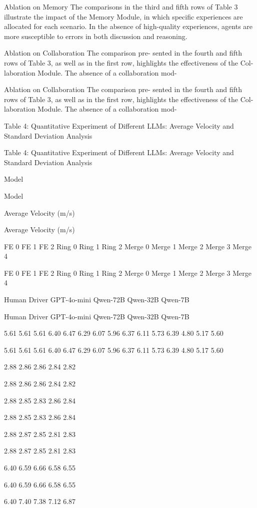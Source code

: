 \documentclass[12pt]{article}
\begin{document}
Ablation on Memory The comparisons in the
third and fifth rows of Table 3 illustrate the impact
of the Memory Module, in which specific experiences
are allocated for each scenario.
In the absence of
high-quality experiences, agents are more susceptible to
errors in both discussion and reasoning.


Ablation on Collaboration The comparison pre-
sented in the fourth and fifth rows of Table 3, as well as
in the first row, highlights the effectiveness of the Col-
laboration Module. The absence of a collaboration mod-


Ablation on Collaboration The comparison pre-
sented in the fourth and fifth rows of Table 3, as well as
in the first row, highlights the effectiveness of the Col-
laboration Module. The absence of a collaboration mod-


Table 4: Quantitative Experiment of Different LLMs: Average Velocity and Standard Deviation Analysis


Table 4: Quantitative Experiment of Different LLMs: Average Velocity and Standard Deviation Analysis


Model


Model


Average Velocity (m/s)


Average Velocity (m/s)


FE 0 FE 1 FE 2 Ring 0 Ring 1 Ring 2 Merge 0 Merge 1 Merge 2 Merge 3 Merge 4


FE 0 FE 1 FE 2 Ring 0 Ring 1 Ring 2 Merge 0 Merge 1 Merge 2 Merge 3 Merge 4


Human Driver
GPT-4o-mini
Qwen-72B
Qwen-32B
Qwen-7B


Human Driver
GPT-4o-mini
Qwen-72B
Qwen-32B
Qwen-7B


5.61
5.61
5.61
6.40 6.47 6.29
6.07
5.96
6.37
6.11
5.73
6.39
4.80
5.17
5.60


5.61
5.61
5.61
6.40 6.47 6.29
6.07
5.96
6.37
6.11
5.73
6.39
4.80
5.17
5.60


2.88
2.86
2.86
2.84
2.82


2.88
2.86
2.86
2.84
2.82


2.88
2.85
2.83
2.86
2.84


2.88
2.85
2.83
2.86
2.84


2.88
2.87
2.85
2.81
2.83


2.88
2.87
2.85
2.81
2.83


6.40
6.59
6.66
6.58
6.55


6.40
6.59
6.66
6.58
6.55


6.40
7.40
7.38
7.12
6.87
\end{document}
